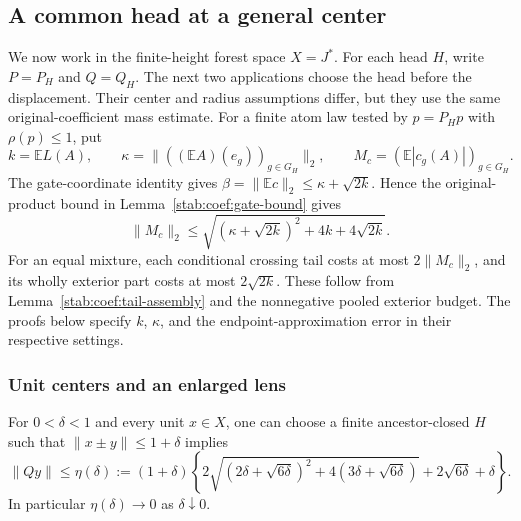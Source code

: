 \subsection{A common head at a general center}

We now work in the finite-height forest space $X=J^*$. For each head
$H$, write $P=P_H$ and $Q=Q_H$. The next two
applications choose the head before the displacement. Their center and
radius assumptions differ, but they use the same original-coefficient
mass estimate. For a finite atom law tested by $p=P_Hp$ with $\rho(p)\le1$, put
\[
 k=\mathbb E L(A),\qquad
 \kappa=\|((\mathbb EA)(e_g))_{g\in G_H}\|_2,\qquad
 M_c=(\mathbb E|c_g(A)|)_{g\in G_H}.
\]
The gate-coordinate identity gives
$\beta=\|\mathbb Ec\|_2\le\kappa+\sqrt{2k}$. Hence the original-product
bound in Lemma~\ref{stab:coef:gate-bound} gives
\[
 \|M_c\|_2\le
 \sqrt{(\kappa+\sqrt{2k})^2+4k+4\sqrt{2k}}.
\]
For an equal mixture, each conditional crossing tail costs at most
$2\|M_c\|_2$, and its wholly exterior part costs at most
$2\sqrt{2k}$. These follow from
Lemma~\ref{stab:coef:tail-assembly} and the nonnegative pooled
exterior budget. The proofs below specify $k$, $\kappa$, and the
endpoint-approximation error in their respective settings.

\subsubsection{Unit centers and an enlarged lens}
\label{molb:sec:original-coefficients}

\begin{proposition}\label{molb:prop:original-lens}
For \(0<\delta<1\) and every unit \(x\in X\), one can choose a finite
ancestor-closed \(H\) such that \(\|x\pm y\|\le1+\delta\) implies
\[
 \|Qy\|\le\eta(\delta):=(1+\delta)
 \left\{2\sqrt{(2\delta+\sqrt{6\delta})^2
                    +4(3\delta+\sqrt{6\delta})}
             +2\sqrt{6\delta}+\delta\right\}.
\]
In particular \(\eta(\delta)\to0\) as \(\delta\downarrow0\).
\end{proposition}

